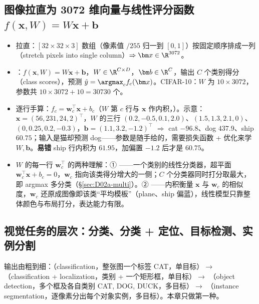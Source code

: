 \subsection{图像拉直为 3072 维向量与线性评分函数 \texorpdfstring{$f(\bm x,W)=W\bm x+\bm b$}{f(x,W)=Wx+b}}
\begin{itemize}
\item 拉直：$[32\times32\times3]$ 数组（像素值 $/255$ 归一到 $[0,1]$）按固定顺序排成一列（stretch pixels into single column）$\Rightarrow\bm x\in\R^{3072}$。
\item {}：$f(\bm x,W)=W\bm x+\bm b$，$W\in\R^{C\times D}$，$\bm b\in\R^C$，输出 $C$ 个类别得分（class scores），预测 $\hat y=\argmax_c f_c(\bm x)$。CIFAR-10：$W$ 为 $10\times3072$，参数共 $10\times3072+10=30730$ 个。
\item 逐行手算：$f_c=\bm w_c^\top\bm x+b_c$（$W$ 第 $c$ 行与 $\bm x$ 作内积，）。示意：$\bm x=(56,231,24,2)^\top$，$W$ 的三行 $(0.2,-0.5,0.1,2.0)$、$(1.5,1.3,2.1,0)$、$(0,0.25,0.2,-0.3)$，$\bm b=(1.1,3.2,-1.2)^\top$ $\Rightarrow$ cat $-96.8$、dog $437.9$、ship $60.75$；输入是猫却预测 dog——参数是随手给的，需要损失函数 + 优化来学 $W,\bm b$。\textbf{易错} ship 行内积为 $61.95$，加偏置 $-1.2$ 后才是 $60.75$。
\item $W$ 的每一行 $\bm w_c^\top$ 的两种理解：① ——一个类别的线性分类器，超平面 $\bm w_c^\top\bm x+b_c=0$，$\bm w_c$ 指向该类得分增大的一侧；$C$ 个分类器同时打分取最大，即 argmax 多分类（§\ref{sec:D02a-multi}）。② ——内积衡量 $\bm x$ 与 $\bm w_c$ 的相似度，$\bm w_c$ 还原成图像即该类“平均模板”（plane、ship 偏蓝），线性模型只靠整体颜色与布局打分，表达能力有限。
\end{itemize}

\subsection{视觉任务的层次：分类、分类 + 定位、目标检测、实例分割}
输出由粗到细：（classification，整张图一个标签 CAT，单目标）$\to$ （classification + localization，类别 + 一个矩形框，单目标）$\to$ （object detection，多个框及各自类别 CAT, DOG, DUCK，多目标）$\to$ （instance segmentation，逐像素分出每个对象实例，多目标）。本章只做第一种。

